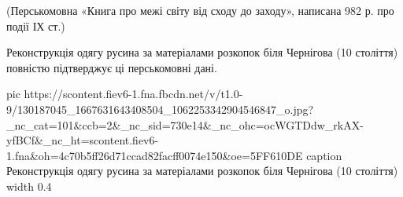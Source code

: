 (Перськомовна «Книга про межі світу від сходу до заходу»,  написана 982 р. про події ІХ ст.)

Реконструкція одягу русина за матеріалами розкопок біля Чернігова (10 століття) повністю підтверджує ці перськомовні дані.

\ifcmt
pic https://scontent.fiev6-1.fna.fbcdn.net/v/t1.0-9/130187045_1667631643408504_1062253342904546847_o.jpg?_nc_cat=101&ccb=2&_nc_sid=730e14&_nc_ohc=ocWGTDdw_rkAX-yfBCf&_nc_ht=scontent.fiev6-1.fna&oh=4c70b5ff26d71ccad82facff0074e150&oe=5FF610DE
caption Реконструкція одягу русина за матеріалами розкопок біля Чернігова (10 століття)
width 0.4
\fi
